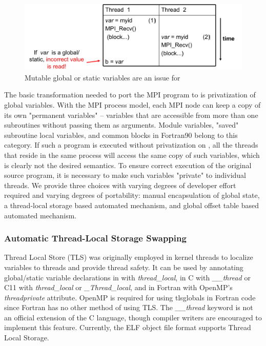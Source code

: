 \documentclass[10pt]{article}
\begin{document}
\begin{figure}[h]
\centering
\includegraphics[width=4.6in]{figs/global.png}
\caption{Mutable global or static variables are an issue for \ampi{}}
\label{fig_global}
\end{figure}

The basic transformation needed to port the MPI program to \ampi{} is
privatization of global variables.
With the MPI process model, each MPI node can keep a copy of its own
"permanent variables" -- variables that are accessible from more than one
subroutines without passing them as arguments.  Module variables, "saved"
subroutine local variables, and common blocks in Fortran90 belong to this
category. If such a program is executed without privatization on \ampi{}, all
the \ampi{} threads that reside in the same process will access the same copy of
such variables, which is clearly not the desired semantics.  To ensure correct
execution of the original source program, it is necessary to make such
variables "private" to individual threads. We provide three choices with varying
degrees of developer effort required and varying degrees of portability:
manual encapsulation of global state, a thread-local storage based automated mechanism, and
global offset table based automated mechanism.

\subsubsection{Automatic Thread-Local Storage Swapping}
Thread Local Store (TLS) was originally employed in kernel threads to
localize variables to threads and provide thread safety. It can be used by annotating
global/static variable declarations in \CC{} with \emph{thread\_local}, in C with \emph{\_\_thread}
or C11 with \emph{thread\_local} or \emph{\_Thread\_local},
and in Fortran with OpenMP's \emph{threadprivate} attribute. OpenMP is required for using tlsglobals
in Fortran code since Fortran has no other method of using TLS. The \emph{\_\_thread} keyword is
not an official extension of the C language, though compiler writers are encouraged to implement
this feature. Currently, the ELF object file format supports Thread Local Storage.
\end{document}
